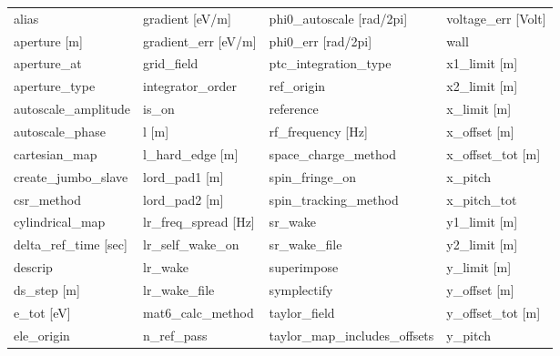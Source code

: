  \begin{tabular}{llll} \toprule
alias                          & gradient [eV/m]                & phi0_autoscale [rad/2pi]       & voltage_err [Volt]             \\
aperture [m]                   & gradient_err [eV/m]            & phi0_err [rad/2pi]             & wall                           \\
aperture_at                    & grid_field                     & ptc_integration_type           & x1_limit [m]                   \\
aperture_type                  & integrator_order               & ref_origin                     & x2_limit [m]                   \\
autoscale_amplitude            & is_on                          & reference                      & x_limit [m]                    \\
autoscale_phase                & l [m]                          & rf_frequency [Hz]              & x_offset [m]                   \\
cartesian_map                  & l_hard_edge [m]                & space_charge_method            & x_offset_tot [m]               \\
create_jumbo_slave             & lord_pad1 [m]                  & spin_fringe_on                 & x_pitch                        \\
csr_method                     & lord_pad2 [m]                  & spin_tracking_method           & x_pitch_tot                    \\
cylindrical_map                & lr_freq_spread [Hz]            & sr_wake                        & y1_limit [m]                   \\
delta_ref_time [sec]           & lr_self_wake_on                & sr_wake_file                   & y2_limit [m]                   \\
descrip                        & lr_wake                        & superimpose                    & y_limit [m]                    \\
ds_step [m]                    & lr_wake_file                   & symplectify                    & y_offset [m]                   \\
e_tot [eV]                     & mat6_calc_method               & taylor_field                   & y_offset_tot [m]               \\
ele_origin                     & n_ref_pass                     & taylor_map_includes_offsets    & y_pitch                        \\

\end{tabular}

